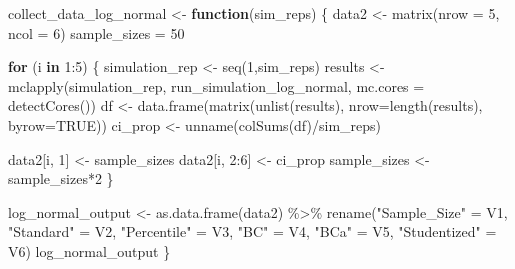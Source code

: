 \documentclass[12pt]{article}
\newenvironment{Shaded}{\begin{snugshade}}{\end{snugshade}}
\newcommand{\AttributeTok}[1]{\textcolor[rgb]{0.77,0.63,0.00}{#1}}
\newcommand{\ConstantTok}[1]{\textcolor[rgb]{0.00,0.00,0.00}{#1}}
\newcommand{\ControlFlowTok}[1]{\textcolor[rgb]{0.13,0.29,0.53}{\textbf{#1}}}
\newcommand{\DecValTok}[1]{\textcolor[rgb]{0.00,0.00,0.81}{#1}}
\newcommand{\FunctionTok}[1]{\textcolor[rgb]{0.00,0.00,0.00}{#1}}
\newcommand{\NormalTok}[1]{#1}
\newcommand{\OtherTok}[1]{\textcolor[rgb]{0.56,0.35,0.01}{#1}}
\newcommand{\SpecialCharTok}[1]{\textcolor[rgb]{0.00,0.00,0.00}{#1}}
\newcommand{\StringTok}[1]{\textcolor[rgb]{0.31,0.60,0.02}{#1}}
\begin{document}
\begin{Shaded}
\begin{Highlighting}[]
\NormalTok{collect\_data\_log\_normal }\OtherTok{\textless{}{-}} \ControlFlowTok{function}\NormalTok{(sim\_reps) \{}
\NormalTok{  data2 }\OtherTok{\textless{}{-}} \FunctionTok{matrix}\NormalTok{(}\AttributeTok{nrow =} \DecValTok{5}\NormalTok{, }\AttributeTok{ncol =} \DecValTok{6}\NormalTok{)}
\NormalTok{  sample\_sizes }\OtherTok{=} \DecValTok{50}
  
  \ControlFlowTok{for}\NormalTok{ (i }\ControlFlowTok{in} \DecValTok{1}\SpecialCharTok{:}\DecValTok{5}\NormalTok{) \{}
\NormalTok{    simulation\_rep }\OtherTok{\textless{}{-}} \FunctionTok{seq}\NormalTok{(}\DecValTok{1}\NormalTok{,sim\_reps)}
\NormalTok{    results }\OtherTok{\textless{}{-}} \FunctionTok{mclapply}\NormalTok{(simulation\_rep, run\_simulation\_log\_normal, }\AttributeTok{mc.cores =} \FunctionTok{detectCores}\NormalTok{())}
\NormalTok{    df }\OtherTok{\textless{}{-}} \FunctionTok{data.frame}\NormalTok{(}\FunctionTok{matrix}\NormalTok{(}\FunctionTok{unlist}\NormalTok{(results), }\AttributeTok{nrow=}\FunctionTok{length}\NormalTok{(results), }\AttributeTok{byrow=}\ConstantTok{TRUE}\NormalTok{))}
\NormalTok{    ci\_prop }\OtherTok{\textless{}{-}} \FunctionTok{unname}\NormalTok{(}\FunctionTok{colSums}\NormalTok{(df)}\SpecialCharTok{/}\NormalTok{sim\_reps)}
    
\NormalTok{    data2[i, }\DecValTok{1}\NormalTok{] }\OtherTok{\textless{}{-}}\NormalTok{ sample\_sizes}
\NormalTok{    data2[i, }\DecValTok{2}\SpecialCharTok{:}\DecValTok{6}\NormalTok{] }\OtherTok{\textless{}{-}}\NormalTok{ ci\_prop}
\NormalTok{    sample\_sizes }\OtherTok{\textless{}{-}}\NormalTok{ sample\_sizes}\SpecialCharTok{*}\DecValTok{2}
\NormalTok{  \}}
  
\NormalTok{  log\_normal\_output }\OtherTok{\textless{}{-}} \FunctionTok{as.data.frame}\NormalTok{(data2) }\SpecialCharTok{\%\textgreater{}\%} 
    \FunctionTok{rename}\NormalTok{(}\StringTok{"Sample\_Size"} \OtherTok{=}\NormalTok{ V1, }\StringTok{"Standard"} \OtherTok{=}\NormalTok{ V2, }\StringTok{"Percentile"} \OtherTok{=}\NormalTok{ V3, }\StringTok{"BC"} \OtherTok{=}\NormalTok{ V4, }
           \StringTok{"BCa"} \OtherTok{=}\NormalTok{ V5, }\StringTok{"Studentized"} \OtherTok{=}\NormalTok{ V6) }
\NormalTok{  log\_normal\_output}
\NormalTok{\}}
\end{Highlighting}
\end{Shaded}
\end{document}
